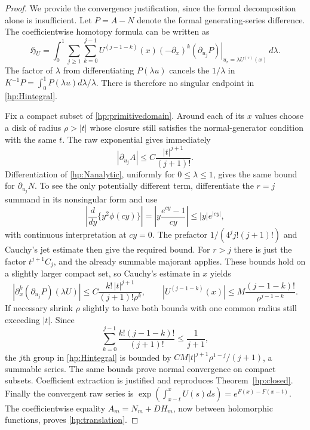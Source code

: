 \documentclass[11pt,a4paper]{article}
\theoremstyle{definition}
\theoremstyle{remark}
\numberwithin{equation}{section}
\begin{document}
\begin{proof}
We provide the convergence justification, since the formal
decomposition alone is insufficient. Let $P=A-N$ denote the
formal generating-series difference. The coefficientwise homotopy
formula can be written as
\begin{equation}\label{hp:Hintegral}
 \mathfrak H_U=\int_0^1\sum_{j\ge1}\sum_{k=0}^{j-1}
 U^{(j-1-k)}(x)(-\partial_x)^k
       \left.(\partial_{u_j}P)\right|_{u_r=\lambda U^{(r)}(x)}
                                      \,d\lambda.
\end{equation}
The factor of $\lambda$ from differentiating $P(\lambda u)$
cancels the $1/\lambda$ in $K^{-1}P=\int_0^1P(\lambda u)d\lambda/\lambda$.
There is therefore no singular endpoint in \eqref{hp:Hintegral}.

Fix a compact subset of \eqref{hp:primitivedomain}. Around each
of its $x$ values choose a disk of radius $\rho>|t|$ whose
closure still satisfies the normal-generator condition with
the same $t$. The raw exponential gives immediately
\[
 |\partial_{u_j}A|\le C\frac{|t|^{j+1}}{(j+1)!}.
\]
Differentiation of \eqref{hp:Nanalytic}, uniformly for
$0\le\lambda\le1$, gives the same bound for
$\partial_{u_j}N$. To see the only potentially different term,
differentiate the $r=j$ summand in its nonsingular form and use
\[
 \left|\frac{d}{dy}\{y^2\phi(cy)\}\right|
   =\left|y\frac{e^{cy}-1}{cy}\right|
   \le |y|e^{|cy|},
\]
with continuous interpretation at $cy=0$. The prefactor
$1/(4^jj!(j+1)!)$ and Cauchy's jet estimate then give
the required bound. For $r>j$ there is just the factor
$t^{j+1}C_j$, and the already summable majorant applies.
These bounds hold on a slightly larger compact set, so Cauchy's
estimate in $x$ yields
\[
 \left|\partial_x^k(\partial_{u_j}P)(\lambda U)\right|
 \le C\frac{k!\,|t|^{j+1}}{(j+1)!\rho^k},\qquad
 |U^{(j-1-k)}(x)|\le M\frac{(j-1-k)!}{\rho^{j-1-k}}.
\]
If necessary shrink $\rho$ slightly to have both bounds with
one common radius still exceeding $|t|$. Since
\[
 \sum_{k=0}^{j-1}\frac{k!(j-1-k)!}{(j+1)!}\le\frac1{j+1},
\]
the $j$th group in \eqref{hp:Hintegral} is bounded by
$CM|t|^{j+1}\rho^{1-j}/(j+1)$, a summable series.
The same bounds prove normal convergence on compact subsets.
Coefficient extraction is justified and reproduces
Theorem~\ref{hp:closed}. Finally the convergent raw series is
$\exp(\int_{x-t}^xU(s)ds)=e^{F(x)-F(x-t)}$.
The coefficientwise equality $A_m=N_m+DH_m$, now between
holomorphic functions, proves \eqref{hp:translation}.
\end{proof}
\end{document}

